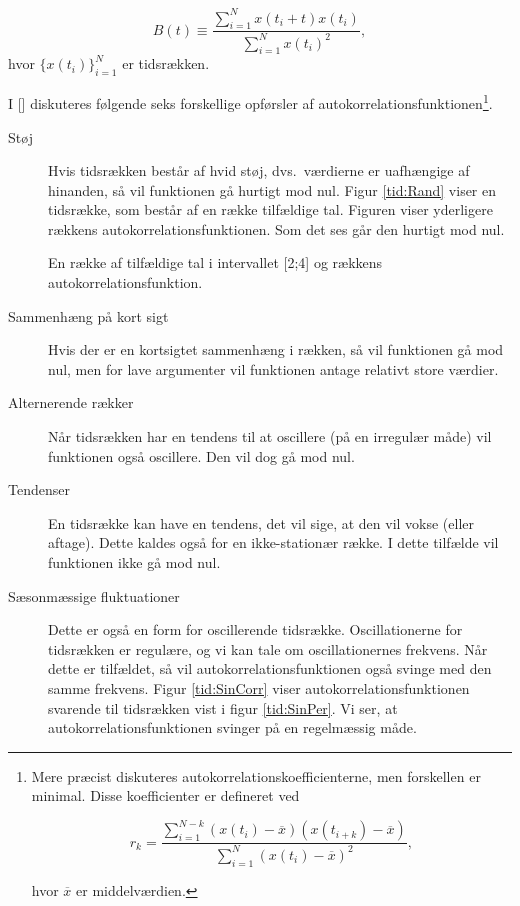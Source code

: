 \begin{equation}
B(t) \equiv \frac{\sum_{i=1}^N x(t_i+t)x(t_i)}{\sum_{i=1}^Nx(t_i)^2},
\end{equation}
hvor $\{x(t_i)\}_{i=1}^N$ er tidsr{\ae}kken. 

I [] diskuteres f{\o}l\-gen\-de seks
forskellige op\-f{\o}rs\-ler af
auto\-korrela\-tions\-funk\-tio\-nen\footnote{Mere
pr{\ae}cist diskuteres autokorrelationskoefficienterne, men
forskellen er minimal. Disse koefficienter er defineret ved

\[
r_k =
\frac{\sum_{i=1}^{N-k}(x(t_i)-\overline{x})(x(t_{i+k})-\overline{x})}{\sum_{i=1}^N(x(t_i)-\overline{x})^2},
\]

hvor $\overline{x}$ er middelv{\ae}rdien.}.

\begin{description}
\item[St{\o}j] 
  Hvis tidsr{\ae}kken best{\aa}r af hvid st{\o}j, dvs.\
  v{\ae}rdierne er uafh{\ae}ngige af hinanden, s{\aa} vil
  funktionen g{\aa} hurtigt mod nul. Figur \ref{tid:Rand}
  viser en tidsr{\ae}kke, som best{\aa}r af en r{\ae}kke
  tilf{\ae}ldige tal. Figuren viser yderligere r{\ae}kkens
  autokorrelationsfunktionen. Som det ses g{\aa}r
  den hurtigt mod nul.

  {\caption{\protect\capsize
      En r{\ae}kke af tilf{\ae}ldige tal i intervallet [2;4] og r{\ae}kkens
      autokorrelationsfunktion.\label{tid:Rand}}} 
  
\item[Sammenh{\ae}ng p{\aa} kort sigt] 
  Hvis der er en kortsigtet sammen\-h{\ae}ng i
  r{\ae}k\-ken, s{\aa} vil funktionen g{\aa} mod nul, men
  for lave argumenter vil funktionen antage relativt store
  v{\ae}rdier.
\item[Alternerende r{\ae}kker]
  N{\aa}r tidsr{\ae}kken har en tendens til at oscillere
  (p{\aa} en irregul{\ae}r m{\aa}de) vil funktionen
  ogs{\aa} oscillere. Den vil dog g{\aa} mod nul.
\item[Tendenser] En tidsr{\ae}kke kan have en tendens,
  det vil sige, at den vil vokse (eller aftage). Dette
  kaldes ogs{\aa} for en ikke-station{\ae}r r{\ae}kke. I
  dette tilf{\ae}lde vil funktionen ikke g{\aa} mod nul.
\item[S{\ae}sonm{\ae}ssige fluktuationer] 
  Dette er ogs{\aa} en form for oscillerende
  tids\-r{\ae}k\-ke. Oscillationerne for tidsr{\ae}kken er
  regul{\ae}re, og vi kan tale om oscillationernes
  frekvens. N{\aa}r dette er tilf{\ae}ldet, s{\aa} vil
  autokorrelationsfunktionen ogs{\aa} svinge med den samme
  frekvens. Figur \ref{tid:SinCorr} viser
  autokorrelationsfunktionen svarende til tidsr{\ae}kken
  vist i figur \ref{tid:SinPer}. Vi ser, at
  autokorrelationsfunktionen svinger p{\aa} en
  regelm{\ae}ssig m{\aa}de.


\end{description}
